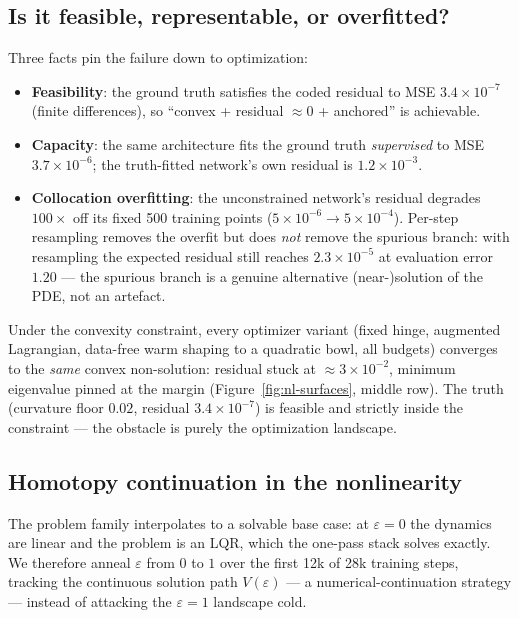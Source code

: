 \documentclass[11pt,a4paper]{article}
\begin{document}
\subsection{Is it feasible, representable, or overfitted?}
Three facts pin the failure down to optimization:
\begin{itemize}[itemsep=1pt]
  \item \textbf{Feasibility}: the ground truth satisfies the coded residual
        to MSE $3.4\times10^{-7}$ (finite differences), so ``convex +
        residual $\approx 0$ + anchored'' is achievable.
  \item \textbf{Capacity}: the same architecture fits the ground truth
        \emph{supervised} to MSE $3.7\times10^{-6}$; the truth-fitted
        network's own residual is $1.2\times10^{-3}$.
  \item \textbf{Collocation overfitting}: the unconstrained network's
        residual degrades $100\times$ off its fixed 500 training points
        ($5\times10^{-6} \to 5\times10^{-4}$). Per-step resampling removes
        the overfit but does \emph{not} remove the spurious branch: with
        resampling the expected residual still reaches $2.3\times10^{-5}$
        at evaluation error $1.20$ --- the spurious branch is a genuine
        alternative (near-)solution of the PDE, not an artefact.
\end{itemize}
Under the convexity constraint, every optimizer variant (fixed hinge,
augmented Lagrangian, data-free warm shaping to a quadratic bowl, all
budgets) converges to the \emph{same} convex non-solution: residual stuck at
$\approx 3\times10^{-2}$, minimum eigenvalue pinned at the margin
(Figure~\ref{fig:nl-surfaces}, middle row). The truth (curvature floor
$0.02$, residual $3.4\times10^{-7}$) is feasible and strictly inside the
constraint --- the obstacle is purely the optimization landscape.

\subsection{Homotopy continuation in the nonlinearity}
The problem family interpolates to a solvable base case: at $\varepsilon=0$
the dynamics are linear and the problem is an LQR, which the one-pass stack
solves exactly. We therefore anneal $\varepsilon$ from $0$ to $1$ over the
first 12k of 28k training steps, tracking the continuous solution path
$V(\varepsilon)$ --- a numerical-continuation strategy
\cite{allgower1990numerical} --- instead of attacking the $\varepsilon=1$
landscape cold.
\end{document}
